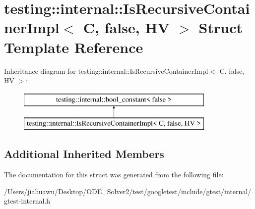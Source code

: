 \hypertarget{structtesting_1_1internal_1_1_is_recursive_container_impl_3_01_c_00_01false_00_01_h_v_01_4}{}\section{testing\+:\+:internal\+:\+:Is\+Recursive\+Container\+Impl$<$ C, false, HV $>$ Struct Template Reference}
\label{structtesting_1_1internal_1_1_is_recursive_container_impl_3_01_c_00_01false_00_01_h_v_01_4}
Inheritance diagram for testing\+:\+:internal\+:\+:Is\+Recursive\+Container\+Impl$<$ C, false, HV $>$\+:\begin{figure}[H]
\begin{center}
\leavevmode
\includegraphics[height=2.000000cm]{structtesting_1_1internal_1_1_is_recursive_container_impl_3_01_c_00_01false_00_01_h_v_01_4}
\end{center}
\end{figure}
\subsection*{Additional Inherited Members}


The documentation for this struct was generated from the following file\+:\begin{DoxyCompactItemize}
\item 
/\+Users/jiahuawu/\+Desktop/\+O\+D\+E\+\_\+\+Solver2/test/googletest/include/gtest/internal/gtest-\/internal.\+h\end{DoxyCompactItemize}
